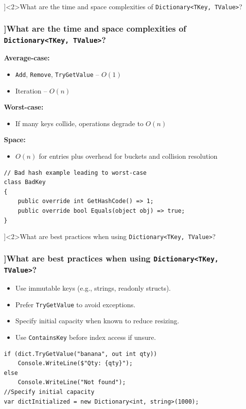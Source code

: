 \QuestionSlide[\CategoryBadge[CollColor!20]{Collections}]<2>{What are the time and space complexities of \texttt{Dictionary<TKey, TValue>}?}
\begin{frame}[fragile]
  \frametitle{\AnswerTitle[\CategoryBadge[CollColor!20]{Collections}]{What are the time and space complexities of \texttt{Dictionary<TKey, TValue>}?}}

  {\footnotesize
    \textbf{Average-case:}
    \begin{itemize}
      \item \texttt{Add}, \texttt{Remove}, \texttt{TryGetValue} – \(O(1)\)
      \item Iteration – \(O(n)\)
    \end{itemize}
    \textbf{Worst-case:}
    \begin{itemize}
      \item If many keys collide, operations degrade to \(O(n)\)
    \end{itemize}
    \textbf{Space:}
    \begin{itemize}
      \item \(O(n)\) for entries plus overhead for buckets and collision resolution
    \end{itemize}
  }

  \begin{verbatim}
// Bad hash example leading to worst-case
class BadKey
{
    public override int GetHashCode() => 1;
    public override bool Equals(object obj) => true;
}
  \end{verbatim}
\end{frame}

\QuestionSlide[\CategoryBadge[CollColor!20]{Collections}]<2>{What are best practices when using \texttt{Dictionary<TKey, TValue>}?}
\begin{frame}[fragile]
  \frametitle{\AnswerTitle[\CategoryBadge[CollColor!20]{Collections}]{What are best practices when using \texttt{Dictionary<TKey, TValue>}?}}

  {\footnotesize
    \begin{itemize}
      \item Use immutable keys (e.g., strings, readonly structs).
      \item Prefer \texttt{TryGetValue} to avoid exceptions.
      \item Specify initial capacity when known to reduce resizing.
      \item Use \texttt{ContainsKey} before index access if unsure.
    \end{itemize}
  }

  \begin{verbatim}
if (dict.TryGetValue("banana", out int qty))
    Console.WriteLine($"Qty: {qty}");
else
    Console.WriteLine("Not found");
//Specify initial capacity
var dictInitialized = new Dictionary<int, string>(1000);
  \end{verbatim}
\end{frame}

